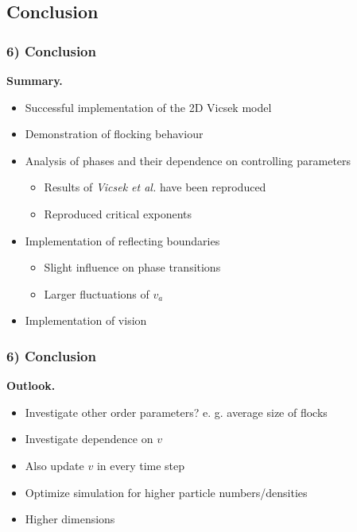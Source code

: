 \subsection{Conclusion}

\begin{frame}
	\frametitle{6) Conclusion}
	\textbf{Summary.}
	\begin{itemize}
	    \item Successful implementation of the 2D Vicsek model
	    \item Demonstration of flocking behaviour
	    \item Analysis of phases and their dependence on controlling parameters 
	    	\begin{itemize}
	    		\item Results of \textit{Vicsek et al.} have been reproduced
	    		\item Reproduced critical exponents
	    	\end{itemize}
	    \item Implementation of reflecting boundaries
	    	\begin{itemize}
	    		\item Slight influence on phase transitions
	    		\item Larger fluctuations of $v_a$
	    	\end{itemize}
	    \item Implementation of vision
	\end{itemize}
\end{frame}

\begin{frame}
	\frametitle{6) Conclusion}
	\textbf{Outlook.}
	\begin{itemize}
	    \item Investigate other order parameters? e. g. average size of flocks
	    \item Investigate dependence on $v$
	    \item Also update $v$ in every time step
	    \item Optimize simulation for higher particle numbers/densities
	    \item Higher dimensions
	\end{itemize}
\end{frame}